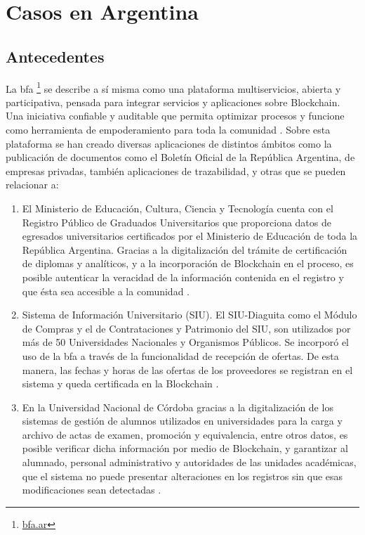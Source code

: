 \section{Casos en Argentina}
\subsection{Antecedentes}


La \gls{bfa} \footnote{\href{https://bfa.ar/}{bfa.ar}} se describe a sí misma como una plataforma multiservicios, abierta y participativa, pensada para integrar servicios y aplicaciones 
sobre Blockchain.
Una iniciativa confiable y auditable que permita optimizar procesos y funcione como herramienta de empoderamiento para toda la comunidad
\cite[]{Blockchain_federal_argentina_que_nodate}.
Sobre esta plataforma se han creado diversas aplicaciones de distintos ámbitos como la publicación de documentos como el {Boletín Oficial de la República Argentina}, de empresas privadas, también aplicaciones de trazabilidad, y otras que se pueden relacionar a:
\begin{enumerate}
  
  \item El Ministerio de Educación, Cultura, Ciencia y Tecnología cuenta con el Registro Público de Graduados Universitarios que proporciona datos de egresados universitarios certificados por el Ministerio de Educación de toda la República Argentina. Gracias a la digitalización del trámite de certificación de diplomas y analíticos, y a la incorporación de  Blockchain  en el proceso, es posible autenticar la veracidad de la información contenida en el registro y que ésta sea accesible a la comunidad \cite[]{Blockchain_federal_argentina_aplicaciones_nodate}.
  
  \item  Sistema de Información Universitario (SIU). El SIU-Diaguita como el  Módulo de Compras y el de  Contrataciones y Patrimonio del SIU, son utilizados por más de 50 Universidades Nacionales y Organismos Públicos. Se incorporó el uso de  la \gls{bfa} a través  de la funcionalidad de recepción de ofertas. De esta manera, las fechas y horas de las ofertas de los proveedores  se registran en el sistema y queda certificada en la Blockchain 
\cite[]{Blockchain_federal_argentina_aplicaciones_nodate}.

\item En la Universidad Nacional de Córdoba gracias a la digitalización de los sistemas de gestión de alumnos utilizados en universidades para la carga y archivo de actas de examen, promoción y equivalencia, entre otros datos, es posible verificar dicha información por medio de  Blockchain, y garantizar al alumnado, personal administrativo y autoridades de las unidades académicas, que el sistema no puede presentar alteraciones en los registros sin que esas modificaciones sean detectadas \cite[]{Blockchain_federal_argentina_aplicaciones_nodate}.
\end{enumerate}


